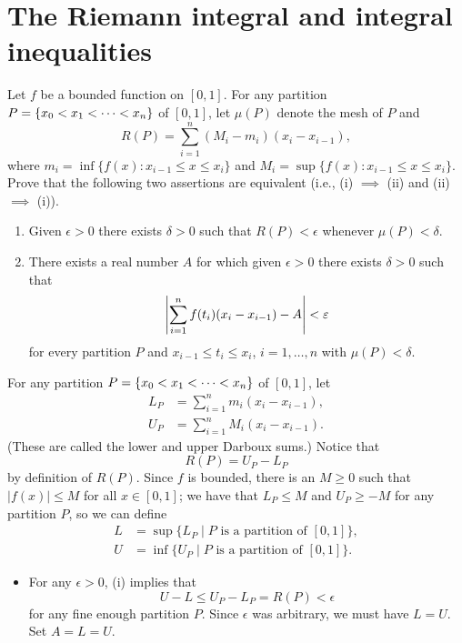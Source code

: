 \section{The Riemann integral and integral inequalities}\label{p:integration}

\begin{problem}
Let $f$ be a bounded function on $[0,1]$. For any partition $P = \left\{ x_0 < x_1 < \cdots < x_n\right\}$ of $[0,1]$, let $\mu(P)$ denote the mesh of $P$ and
$$ R(P) = \sum_{i=1}^n (M_i - m_i)(x_i - x_{i-1}), $$
where $m_i = \inf\{f(x) : x_{i-1} \leq x \leq x_i\}$ and $M_i = \sup\{f(x) : x_{i-1} \leq x \leq x_i\}$. Prove that the following two assertions are equivalent (i.e., (i) $\implies$ (ii) and (ii) $\implies$ (i)).
\begin{enumerate}
    \item[(i)] Given $\epsilon > 0$ there exists $\delta > 0$ such that $R(P) < \epsilon$ whenever $\mu(P) < \delta$.
    \item[(ii)] There exists a real number $A$ for which given $\epsilon > 0$ there exists $\delta > 0$ such that
    $$ \left\lvert \sum_{i=1}^n f(t_i) (x_i - x_{i-1}) - A\right\rvert < \varepsilon $$
    for every partition $P$ and $x_{i-1} \leq t_i \leq x_i$, $i = 1, \ldots, n$ with $\mu(P) < \delta$.
\end{enumerate}
\begin{solution}
For any partition $P = \left\{ x_0 < x_1 < \cdots < x_n\right\}$ of $[0,1]$, let
\begin{align*}
    L_P &= \sum_{i=1}^n m_i (x_i - x_{i-1}), \\
    U_P &= \sum_{i=1}^n M_i (x_i - x_{i-1}).
\end{align*}
(These are called the lower and upper Darboux sums.) Notice that
$$ R(P) = U_P - L_P $$
by definition of $R(P)$.
Since $f$ is bounded, there is an $M \geq 0$ such that $|f(x)| \leq M$ for all $x \in [0,1]$; we have that $L_P \leq M$ and $U_P \geq -M$ for any partition $P$, so we can define
\begin{align*}
    L &= \sup\{L_P \mid P \text{ is a partition of } [0,1]\}, \\
    U &= \inf\{U_P \mid P \text{ is a partition of } [0,1]\}.
\end{align*}
\begin{itemize}
    \item[] [(i) $\implies$ (ii)] For any $\epsilon > 0$, (i) implies that
    $$ U - L \leq U_P - L_P = R(P) < \epsilon $$
    for any fine enough partition $P$. Since $\epsilon$ was arbitrary, we must have $L = U$. Set $A = L = U$.
    

\end{itemize}
\end{solution}
\end{problem}
